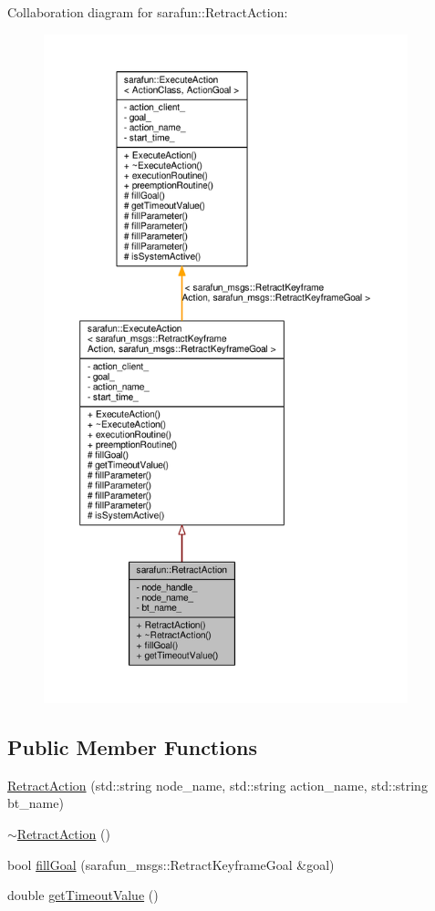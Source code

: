 Collaboration diagram for sarafun\-:\-:Retract\-Action\-:\nopagebreak
\begin{figure}[H]
\begin{center}
\leavevmode
\includegraphics[height=550pt]{de/d4f/classsarafun_1_1RetractAction__coll__graph}
\end{center}
\end{figure}
\subsection*{Public Member Functions}
\begin{DoxyCompactItemize}
\item 
\hyperlink{classsarafun_1_1RetractAction_a0f56a3d5ff6c07f48bbd3cede93f0a81_a0f56a3d5ff6c07f48bbd3cede93f0a81}{Retract\-Action} (std\-::string node\-\_\-name, std\-::string action\-\_\-name, std\-::string bt\-\_\-name)
\item 
\hyperlink{classsarafun_1_1RetractAction_adb37a0fb90d06636009f90b7565f00cf_adb37a0fb90d06636009f90b7565f00cf}{$\sim$\-Retract\-Action} ()
\item 
bool \hyperlink{classsarafun_1_1RetractAction_ad0db1c2615d68603bc972ffa26049a70_ad0db1c2615d68603bc972ffa26049a70}{fill\-Goal} (sarafun\-\_\-msgs\-::\-Retract\-Keyframe\-Goal \&goal)
\item 
double \hyperlink{classsarafun_1_1RetractAction_af95bb8d3826dbe1444a8a3e12d8596b0_af95bb8d3826dbe1444a8a3e12d8596b0}{get\-Timeout\-Value} ()
\end{DoxyCompactItemize}
